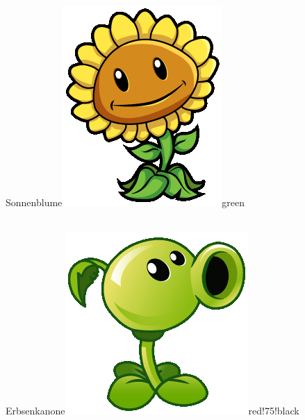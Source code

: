 \documentclass[11pt, a5paper]{article}
\begin{document}
	\begin{mybox}{Sonnenblume}{\includegraphics[scale=0.1]{sunflower}}{green}
	\phantom{My}\\ \\
		\tcblower
	\end{mybox}
	
	\begin{mybox}{Erbsenkanone}{\includegraphics[scale=0.1]{pea}}{red!75!black}
		\phantom{My}\\ \\
	\end{mybox}
	
\end{document}
